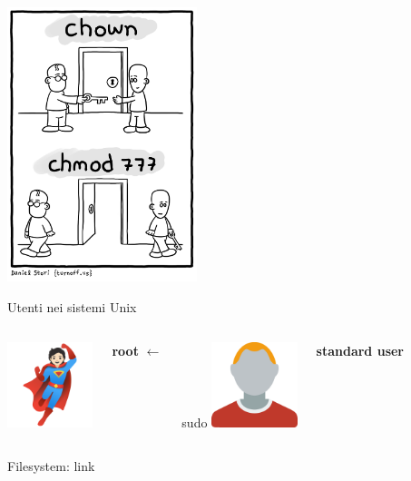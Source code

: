 \documentclass{beamer}
\begin{document}
    \begin{frame}{}
        \centering
        \includegraphics[height=8cm, keepaspectratio]{images/chown-chmod.png}
    \end{frame}

    \begin{frame}{Utenti nei sistemi Unix}
        \begin{columns}[t, onlytextwidth]
                \centering
                \includegraphics[height=2.5cm, keepaspectratio]{images/root.pdf}

                \large \textbf{root}
                \centering
                \Huge $\longleftarrow$

                \large sudo
                \centering
                \includegraphics[height=2.5cm, keepaspectratio]{images/user2.pdf}

                \large \textbf{standard user}
        \end{columns}
    \end{frame}

    \begin{frame}{Filesystem: link}
    \end{frame}
\end{document}
